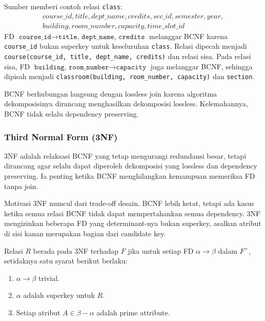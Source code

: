 Sumber memberi contoh relasi \texttt{class}:
\[
\begin{array}{l}
course\_id, title, dept\_name, credits, sec\_id, semester, year,\\
building, room\_number, capacity, time\_slot\_id
\end{array}
\]
FD \(\texttt{course\_id} \rightarrow \texttt{title, dept\_name, credits}\) melanggar BCNF karena \texttt{course\_id} bukan superkey untuk keseluruhan \texttt{class}. Relasi dipecah menjadi \texttt{course(course\_id, title, dept\_name, credits)} dan relasi sisa. Pada relasi sisa, FD \(\texttt{building, room\_number} \rightarrow \texttt{capacity}\) juga melanggar BCNF, sehingga dipisah menjadi \texttt{classroom(building, room\_number, capacity)} dan \texttt{section}.

BCNF berhubungan langsung dengan lossless join karena algoritma dekomposisinya dirancang menghasilkan dekomposisi lossless. Kelemahannya, BCNF tidak selalu dependency preserving.

\subsubsection{Third Normal Form (3NF)}

\begin{jawab}
3NF adalah relaksasi BCNF yang tetap mengurangi redundansi besar, tetapi dirancang agar selalu dapat diperoleh dekomposisi yang lossless dan dependency preserving. Ia penting ketika BCNF menghilangkan kemampuan memeriksa FD tanpa join.
\end{jawab}

Motivasi 3NF muncul dari trade-off desain. BCNF lebih ketat, tetapi ada kasus ketika semua relasi BCNF tidak dapat mempertahankan semua dependency. 3NF mengizinkan beberapa FD yang determinant-nya bukan superkey, asalkan atribut di sisi kanan merupakan bagian dari candidate key.

Relasi \(R\) berada pada 3NF terhadap \(F\) jika untuk setiap FD \(\alpha \rightarrow \beta\) dalam \(F^+\), setidaknya satu syarat berikut berlaku:
\begin{enumerate}
    \item \(\alpha \rightarrow \beta\) trivial.
    \item \(\alpha\) adalah superkey untuk \(R\).
    \item Setiap atribut \(A \in \beta-\alpha\) adalah prime attribute.
\end{enumerate}

